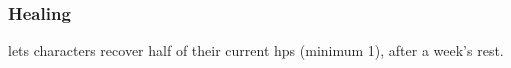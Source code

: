 %
\subsubsection{Healing}
lets characters recover half of their current \glspl{hp} (minimum 1), after a week's rest.

